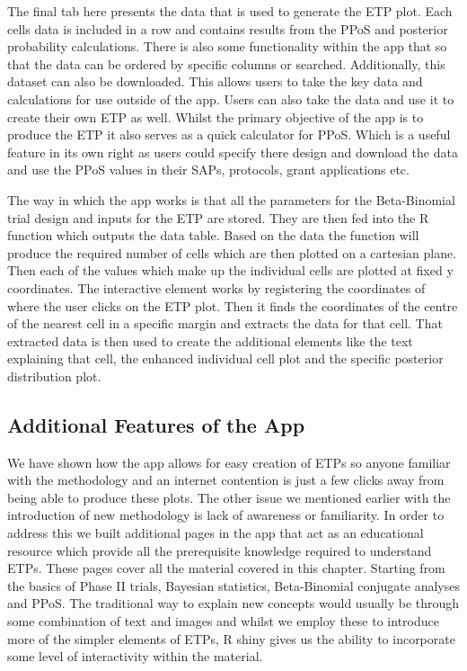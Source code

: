 The final tab here presents the data that is used to generate the ETP plot. Each cells data is included in a row and contains results from the PPoS and posterior probability calculations. There is also some functionality within the app that so that the data can be ordered by specific columns or searched. Additionally, this dataset can also be downloaded. This allows users to take the key data and calculations for use outside of the app. Users can also take the data and use it to create their own ETP as well. Whilst the primary objective of the app is to produce the ETP it also serves as a quick calculator for PPoS. Which is a useful feature in its own right as users could specify there design and download the data and use the PPoS values in their SAPs, protocols, grant applications etc.   

The way in which the app works is that all the parameters for the Beta-Binomial trial design and inputs for the ETP are stored. They are then fed into the R function which outputs the data table. Based on the data the function will produce the required number of cells which are then plotted on a cartesian plane. Then each of the values which make up the individual cells are plotted at fixed y coordinates. The interactive element works by registering the coordinates of where the user clicks on the ETP plot. Then it finds the coordinates of the centre of the nearest cell in a specific margin and extracts the data for that cell. That extracted data is then used to create the additional elements like the text explaining that cell, the enhanced individual cell plot and the specific posterior distribution plot. 

\subsection{Additional Features of the App}

We have shown how the app allows for easy creation of ETPs so anyone familiar with the methodology and an internet contention is just a few clicks away from being able to produce these plots. The other issue we mentioned earlier with the introduction of new methodology is lack of awareness or familiarity. In order to address this we built additional pages in the app that act as an educational resource which provide all the prerequisite knowledge required to understand ETPs. These pages cover all the material covered in this chapter. Starting from the basics of Phase \RN{2} trials, Bayesian statistics, Beta-Binomial conjugate analyses and PPoS. The traditional way to explain new concepts would usually be through some combination of text and images and whilst we employ these to introduce more of the simpler elements of ETPs, R shiny gives us the ability to incorporate some level of interactivity within the material. 

